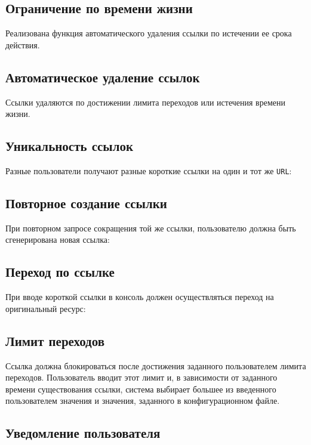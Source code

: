 \documentclass[a4paper, 14pt]{article}
\begin{document}
\subsection{Ограничение по времени жизни}

Реализована функция автоматического удаления ссылки по истечении ее срока действия.

\subsection{Автоматическое удаление ссылок}

Ссылки удаляются по достижении лимита переходов или истечения времени жизни.

\subsection{Уникальность ссылок}

Разные пользователи получают разные короткие ссылки на один и тот же \texttt{URL}:

\subsection{Повторное создание ссылки}

При повторном запросе сокращения той же ссылки, пользователю должна быть сгенерирована новая ссылка:

\subsection{Переход по ссылке}

При вводе короткой ссылки в консоль должен осуществляться переход на оригинальный ресурс:

\subsection{Лимит переходов}

Ссылка должна блокироваться после достижения заданного пользователем лимита переходов. Пользователь вводит этот лимит и, в зависимости от заданного времени существования ссылки, система выбирает большее из введенного пользователем значения и значения, заданного в конфигурационном файле.

\subsection{Уведомление пользователя}
\end{document}
